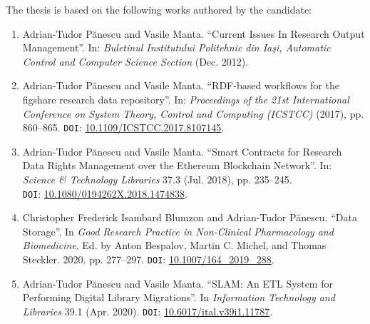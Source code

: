 The thesis is based on the following works authored by the candidate:

\begin{enumerate}

    \item Adrian-Tudor P\u{a}nescu and Vasile Manta. ``Current Issues In Research Output Management''. In: \emph{Buletinul Institutului Politehnic din Ia\c{s}i, Automatic Control and Computer Science Section} (Dec. 2012).
    
    \item Adrian-Tudor P\u{a}nescu and Vasile Manta. ``RDF-based workflows for the figshare research data repository''. In: \emph{Proceedings of the  21st International Conference on System Theory, Control and Computing (ICSTCC)} (2017), pp. 860--865. \texttt{DOI}: \href{https://doi.org/10.1109/ICSTCC.2017.8107145}{10.1109/ICSTCC.2017.8107145}.
    
    \item Adrian-Tudor P\u{a}nescu and Vasile Manta. ``Smart Contracts for Research Data Rights Management over the Ethereum Blockchain Network''. In: \emph{Science \& Technology Libraries} 37.3 (Jul. 2018), pp. 235--245.\\\texttt{DOI}: \href{https://doi.org/10.1080/0194262X.2018.1474838}{10.1080/0194262X.2018.1474838}.
    
    \item Christopher Frederick Isambard Blumzon and Adrian-Tudor P\u{a}nescu. ``Data Storage''. In \emph{Good Research Practice in Non-Clinical Pharmacology and\\Biomedicine}. Ed. by Anton Bespalov, Martin C. Michel, and Thomas Steckler. 2020. pp. 277--297. \texttt{DOI}: \href{https://doi.org/10.1007/164\_2019\_288}{10.1007/164\_2019\_288}.
    
    \item Adrian-Tudor P\u{a}nescu and Vasile Manta. ``SLAM: An ETL System for Performing Digital Library Migrations''. In \emph{Information Technology and Libraries} 39.1 (Apr. 2020). \texttt{DOI}: \href{https://doi.org/10.6017/ital.v39i1.11787}{10.6017/ital.v39i1.11787}.
\end{enumerate}